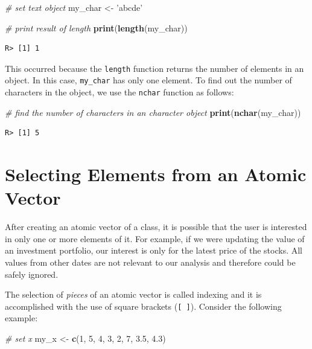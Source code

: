\documentclass[
  12pt,
]{book}
\newenvironment{Shaded}{\begin{snugshade}}{\end{snugshade}}
\newcommand{\CommentTok}[1]{\textcolor[rgb]{0.37,0.37,0.37}{\textit{#1}}}
\newcommand{\DecValTok}[1]{\textcolor[rgb]{0.06,0.06,0.06}{#1}}
\newcommand{\FloatTok}[1]{\textcolor[rgb]{0.06,0.06,0.06}{#1}}
\newcommand{\KeywordTok}[1]{\textcolor[rgb]{0.27,0.27,0.27}{\textbf{#1}}}
\newcommand{\NormalTok}[1]{#1}
\newcommand{\StringTok}[1]{\textcolor[rgb]{0.5,0.5,0.5}{#1}}
\begin{document}
\begin{Shaded}
\begin{Highlighting}[]
\CommentTok{# set text object}
\NormalTok{my_char <-}\StringTok{ 'abcde'}

\CommentTok{# print result of length}
\KeywordTok{print}\NormalTok{(}\KeywordTok{length}\NormalTok{(my_char))}
\end{Highlighting}
\end{Shaded}

\begin{verbatim}
R> [1] 1
\end{verbatim}

This occurred because the \texttt{length} function returns the number of elements in an object. In this case, \texttt{my\_char} has only one element. To find out the number of characters in the object, we use the \texttt{nchar} function as follows: 

\begin{Shaded}
\begin{Highlighting}[]
\CommentTok{# find the number of characters in an character object}
\KeywordTok{print}\NormalTok{(}\KeywordTok{nchar}\NormalTok{(my_char))}
\end{Highlighting}
\end{Shaded}

\begin{verbatim}
R> [1] 5
\end{verbatim}

\hypertarget{selecting-elements-from-an-atomic-vector}{%
\section{Selecting Elements from an Atomic Vector}\label{selecting-elements-from-an-atomic-vector}}

After creating an atomic vector of a class, it is possible that the user is interested in only one or more elements of it. For example, if we were updating the value of an investment portfolio, our interest is only for the latest price of the stocks. All values from other dates are not relevant to our analysis and therefore could be safely ignored.

The selection of \emph{pieces} of an atomic vector is called indexing and it is accomplished with the use of square brackets (\texttt{{[}\ {]}}). Consider the following example:

\begin{Shaded}
\begin{Highlighting}[]
\CommentTok{# set x}
\NormalTok{my_x <-}\StringTok{ }\KeywordTok{c}\NormalTok{(}\DecValTok{1}\NormalTok{, }\DecValTok{5}\NormalTok{, }\DecValTok{4}\NormalTok{, }\DecValTok{3}\NormalTok{, }\DecValTok{2}\NormalTok{, }\DecValTok{7}\NormalTok{, }\FloatTok{3.5}\NormalTok{, }\FloatTok{4.3}\NormalTok{)}
\end{Highlighting}
\end{Shaded}
\end{document}
